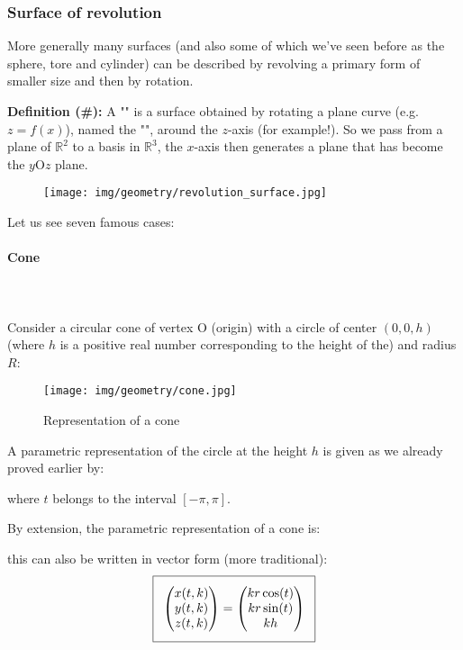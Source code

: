 {	
	
	\pagebreak
	\subsubsection{Surface of revolution}
	More generally many surfaces (and also some of which we've seen before as the sphere, tore and cylinder) can be described by revolving a primary form of smaller size and then by rotation.
	
	\textbf{Definition (\#\mydef):} A "" is a surface obtained by rotating a plane curve (e.g. $z=f(x)$), named the "", around the $z$-axis (for example!). So we pass from a plane of $\mathbb{R}^2$ to a basis in $\mathbb{R}^3$, the $x$-axis then generates a plane that has become the $y$O$z$ plane.
	\begin{figure}[H]
		\centering
		\texttt{[image: img/geometry/revolution\_surface.jpg]}
	\end{figure}
	Let us see seven famous cases:
	
	\paragraph{Cone}\label{cone of revolution}\mbox{}\\\\
	Consider a circular cone of vertex O (origin) with a circle of center $(0,0, h)$ (where $h$ is a positive real number corresponding to the height of the) and radius $R$:
	\begin{figure}[H]
		\centering
		\texttt{[image: img/geometry/cone.jpg]}
		\caption{Representation of a cone}
	\end{figure}
	A parametric representation of the circle at the height $h$ is given as we already proved earlier by:
	
	where $t$ belongs to the interval $[-\pi,\pi]$.
	
	By extension, the parametric representation of a cone is:
	
	this can also be written in vector form (more traditional):
	\begin{equation}
	  \addtolength{\fboxsep}{5pt}
	   \boxed{
	   \begin{gathered}
	   		\begin{pmatrix}
	   		x(t,k)\\y(t,k)\\z(t,k)
	   		\end{pmatrix}=
	   		\begin{pmatrix}
	   		kr\cos(t)\\kr\sin(t)\\kh
	   		\end{pmatrix}
	   \end{gathered}
	   }
	\end{equation}
	
}
